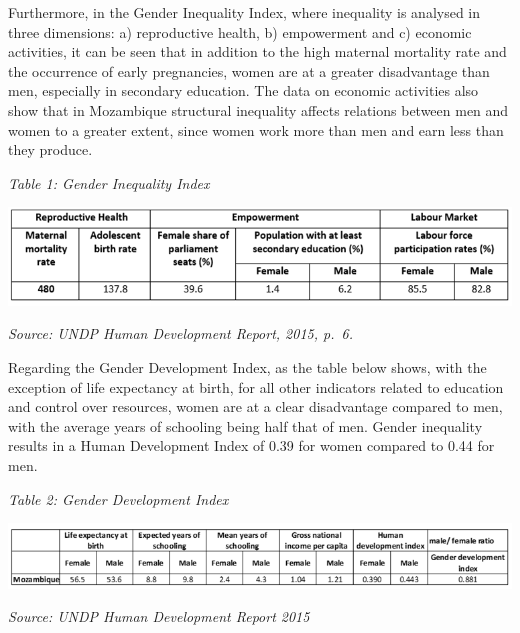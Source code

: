 \documentclass[
]{book}
\begin{document}
Furthermore, in the Gender Inequality Index, where inequality is analysed in three dimensions: a) reproductive health, b) empowerment and c) economic activities, it can be seen that in addition to the high maternal mortality rate and the occurrence of early pregnancies, women are at a greater disadvantage than men, especially in secondary education. The data on economic activities also show that in Mozambique structural inequality affects relations between men and women to a greater extent, since women work more than men and earn less than they produce.

\emph{Table 1: Gender Inequality Index}

\includegraphics{Figure44.png}

\emph{Source: UNDP Human Development Report, 2015, p.~6.}

Regarding the Gender Development Index, as the table below shows, with the exception of life expectancy at birth, for all other indicators related to education and control over resources, women are at a clear disadvantage compared to men, with the average years of schooling being half that of men. Gender inequality results in a Human Development Index of 0.39 for women compared to 0.44 for men.

\emph{Table 2: Gender Development Index}

\includegraphics{Figure45.png}

\emph{Source: UNDP Human Development Report 2015}
\end{document}
